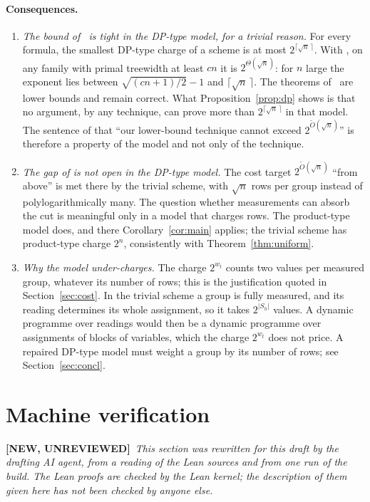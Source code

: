 \documentclass[11pt,a4paper]{article}
\newcommand{\NEWU}{\textbf{[NEW, UNREVIEWED]}}
\theoremstyle{definition}
\theoremstyle{remark}
\begin{document}
\paragraph{Consequences.}
\begin{enumerate}
\item \emph{The bound of~\cite{DL} is tight in the DP-type model, for a trivial reason.} For
 every formula, the smallest DP-type charge of a scheme is at most
 $2^{\lceil\sqrt n\,\rceil}$. With \cite[Theorem~8.1]{DL}, on any family with primal
 treewidth at least $cn$ it is $2^{\Theta(\sqrt n)}$: for $n$ large the exponent lies
 between $\sqrt{(cn+1)/2}-1$ and $\lceil\sqrt n\,\rceil$. The theorems of~\cite{DL} are lower
 bounds and remain correct. What Proposition~\ref{prop:dp} shows is that no argument, by any
 technique, can prove more than $2^{\lceil\sqrt n\,\rceil}$ in that model. The sentence of
 \cite[Section~9]{DL} that ``our lower-bound technique cannot exceed
 $2^{\tilde O(\sqrt n)}$'' is therefore a property of the model and not only of the
 technique.
\item \emph{The gap of \cite[Section~9]{DL} is not open in the DP-type model.} The cost
 target $2^{\tilde O(\sqrt n)}$ ``from above'' is met there by the trivial scheme, with
 $\sqrt n$ rows per group instead of polylogarithmically many. The question whether
 measurements can absorb the cut is meaningful only in a model that charges rows. The
 product-type model does, and there Corollary~\ref{cor:main} applies; the trivial scheme has
 product-type charge $2^n$, consistently with Theorem~\ref{thm:uniform}.
\item \emph{Why the model under-charges.} The charge $2^{w_t}$ counts two values per measured
 group, whatever its number of rows; this is the justification quoted in
 Section~\ref{sec:cost}. In the trivial scheme a group is fully measured, and its reading
 determines its whole assignment, so it takes $2^{|S_h|}$ values. A dynamic programme over
 readings would then be a dynamic programme over assignments of blocks of variables, which
 the charge $2^{w_t}$ does not price. A repaired DP-type model must weight a group by its
 number of rows; see Section~\ref{sec:concl}.
\end{enumerate}

\section{Machine verification}\label{sec:lean}

\noindent\NEWU\ \emph{This section was rewritten for this draft by the drafting AI agent,
from a reading of the Lean sources and from one run of the build. The Lean proofs are
checked by the Lean kernel; the description of them given here has not been checked by
anyone else.}
\end{document}

